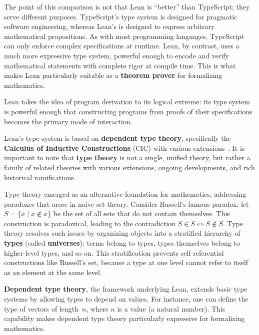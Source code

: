 The point of this comparison is not that Lean is ``better'' than
TypeScript; they serve different purposes.
TypeScript's type system is designed for pragmatic software
engineering, whereas Lean's is designed to express arbitrary
mathematical propositions.
As with most programming languages, TypeScript can only enforce
complex specifications at runtime.
Lean, by contrast, uses a much more expressive type system, powerful
enough to encode and verify mathematical statements with complete
rigor at compile time.
This is what makes Lean particularly suitable as a
\textbf{theorem prover} for formalizing mathematics.

Lean takes the idea of program derivation to its logical extreme:
its type system is powerful enough that constructing programs from
proofs of their specifications becomes the primary mode of
interaction.

Lean's type system is based on \textbf{dependent type theory},
specifically the \textbf{Calculus of Inductive Constructions} (CIC)
with various extensions~\cite{carneiro2019type}.
It is important to note that \textbf{type theory} is not a single,
unified theory, but rather a family of related theories with various
extensions, ongoing developments, and rich historical ramifications.

Type theory emerged as an alternative foundation for mathematics,
addressing paradoxes that arose in naive set theory.
Consider Russell's famous paradox:
let $S = \{x \mid x \notin x\}$ be the set of all sets that do not
contain themselves.
This construction is paradoxical, leading to the contradiction
$S \in S \iff S \notin S$.
Type theory resolves such issues by organizing objects into a
stratified hierarchy of \textbf{types} (called \textbf{universes}):
terms belong to types, types themselves belong to higher-level types,
and so on.
This stratification prevents self-referential constructions like
Russell's set, because a type at one level cannot refer to itself as
an element at the same level.

\textbf{Dependent type theory}, the framework underlying Lean,
extends basic type systems by allowing types to depend on values.
For instance, one can define the type of vectors of length~$n$,
where $n$ is a value (a natural number).
This capability makes dependent type theory particularly expressive
for formalizing mathematics.

